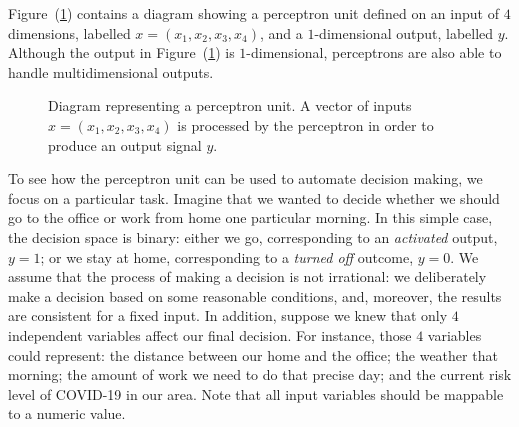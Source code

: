 Figure~(\ref{fig:neural_networks/perceptron}) contains a diagram showing a perceptron unit defined
on an input of $4$ dimensions, labelled $x = (x_1, x_2, x_3, x_4)$, and a $1$-dimensional output,
labelled $y$. Although the output in Figure~(\ref{fig:neural_networks/perceptron}) is
$1$-dimensional, perceptrons are also able to handle multidimensional outputs.

\begin{figure}[H]
	\caption{
        Diagram representing a perceptron unit. A vector of inputs $x = (x_1, x_2, x_3, x_4)$ is
        processed by the perceptron in order to produce an output signal $y$.
    }\label{fig:neural_networks/perceptron}
	\centering
\end{figure}

To see how the perceptron unit can be used to automate decision making, we focus on a particular
task. Imagine that we wanted to decide whether we should go to the office or work from home one
particular morning. In this simple case, the decision space is binary: either we go, corresponding
to an \textit{activated} output, $y = 1$; or we stay at home, corresponding to a \textit{turned off}
outcome, $y = 0$. We assume that the process of making a decision is not irrational: we deliberately
make a decision based on some reasonable conditions, and, moreover, the results are consistent for a
fixed input. In addition, suppose we knew that only $4$ independent variables affect our final
decision. For instance, those $4$ variables could represent: the distance between our home and the
office; the weather that morning; the amount of work we need to do that precise day; and the current
risk level of COVID-19 in our area. Note that all input variables should be mappable to a numeric
value.

